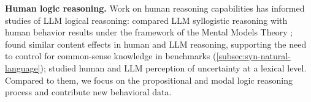 \vspace{2pt}
\noindent\textbf{Human logic reasoning.}
Work on human reasoning capabilities has informed studies of LLM logical reasoning: \citet{eisape-etal-2024-systematic} compared LLM syllogistic reasoning with human behavior results \citep{ragniWhenDoesReasoner2019} under the framework of the Mental Models Theory \citep{johnson-1983-mental}; \citet{lampinenLanguageModelsHumans2024} found similar content effects in human and LLM reasoning, supporting the need to control for common-sense knowledge in benchmarks (\cref{subsec:syn-natural-language});
\citet{belemPerceptionsLinguisticUncertainty2024a} studied human and LLM perception of uncertainty at a lexical level.
Compared to them, we focus on the propositional and modal logic reasoning process and contribute new behavioral data.
